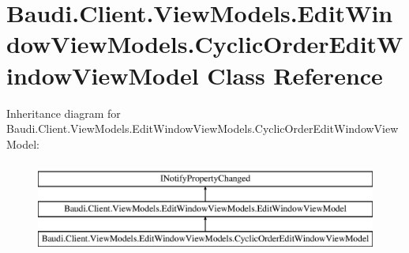 \hypertarget{class_baudi_1_1_client_1_1_view_models_1_1_edit_window_view_models_1_1_cyclic_order_edit_window_view_model}{}\section{Baudi.\+Client.\+View\+Models.\+Edit\+Window\+View\+Models.\+Cyclic\+Order\+Edit\+Window\+View\+Model Class Reference}
\label{class_baudi_1_1_client_1_1_view_models_1_1_edit_window_view_models_1_1_cyclic_order_edit_window_view_model}
Inheritance diagram for Baudi.\+Client.\+View\+Models.\+Edit\+Window\+View\+Models.\+Cyclic\+Order\+Edit\+Window\+View\+Model\+:\begin{figure}[H]
\begin{center}
\leavevmode
\includegraphics[height=3.000000cm]{class_baudi_1_1_client_1_1_view_models_1_1_edit_window_view_models_1_1_cyclic_order_edit_window_view_model}
\end{center}
\end{figure}
